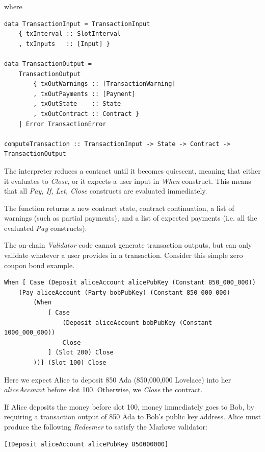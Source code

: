 \documentclass[runningheads]{llncs}
\begin{document}
\noindent
where

\begin{verbatim}
data TransactionInput = TransactionInput
    { txInterval :: SlotInterval
    , txInputs   :: [Input] }

data TransactionOutput =
    TransactionOutput
        { txOutWarnings :: [TransactionWarning]
        , txOutPayments :: [Payment]
        , txOutState    :: State
        , txOutContract :: Contract }
    | Error TransactionError

computeTransaction :: TransactionInput -> State -> Contract -> TransactionOutput
\end{verbatim}

\noindent
The interpreter reduces a contract until it becomes quiescent, meaning that either it evaluates to \emph{Close},
or it expects a user input in \emph{When} construct.
This means that all \emph{Pay, If, Let, Close} constructs are evaluated immediately.

The function returns a new contract state, contract continuation, a list of warnings (such as partial payments),
and a list of expected payments (i.e. all the evaluated \emph{Pay} constructs).

The on-chain \emph{Validator} code cannot generate transaction outputs,
but can only validate whatever a user provides in a transaction.
Consider this simple zero coupon bond example.

\begin{verbatim}
When [ Case (Deposit aliceAccount alicePubKey (Constant 850_000_000))
    (Pay aliceAccount (Party bobPubKey) (Constant 850_000_000)
        (When
            [ Case
                (Deposit aliceAccount bobPubKey (Constant 1000_000_000))
                Close
            ] (Slot 200) Close
        ))] (Slot 100) Close
\end{verbatim}

\noindent
Here we expect Alice to deposit 850 Ada (850,000,000 Lovelace) into her $aliceAccount$ before slot 100.
Otherwise, we \emph{Close} the contract.

If Alice deposits the money before slot 100, money immediately goes to Bob,
by requiring a transaction output of 850 Ada to Bob's public key address.
Alice must produce the following \emph{Redeemer} to satisfy the Marlowe validator:

\begin{verbatim}
[IDeposit aliceAccount alicePubKey 850000000]
\end{verbatim}
\end{document}
